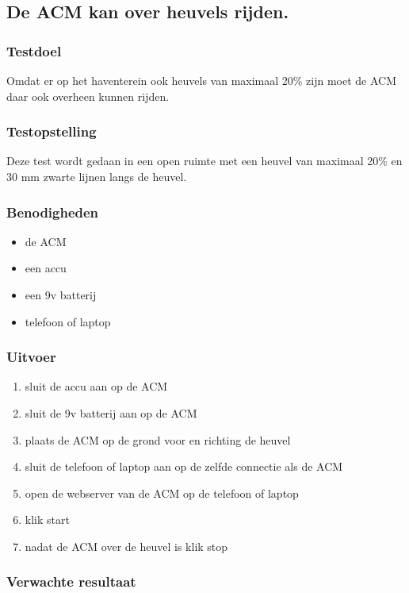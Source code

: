 \subsection{De ACM kan over heuvels rijden.}
\subsubsection{Testdoel}
\begin{flushleft}
    Omdat er op het haventerein ook heuvels van maximaal 20\% zijn moet de ACM daar ook overheen kunnen rijden.
\end{flushleft}
\subsubsection{Testopstelling}
\begin{flushleft}
    Deze test wordt gedaan in een open ruimte met een heuvel van maximaal 20\% en 30 mm zwarte lijnen langs de heuvel.
\end{flushleft}
\subsubsection{Benodigheden}

\begin{itemize}
    \item de ACM
    \item een accu
    \item een 9v batterij
    \item telefoon of laptop
\end{itemize}
\subsubsection{Uitvoer}
\begin{enumerate}
    \item sluit de accu aan op de ACM
    \item sluit de 9v batterij aan op de ACM
    \item plaats de ACM op de grond voor en richting de heuvel
    \item sluit de telefoon of laptop aan op de zelfde connectie als de ACM
    \item open de webserver van de ACM op de telefoon of laptop
    \item klik start
    \item nadat de ACM over de heuvel is klik stop
\end{enumerate}
\subsubsection{Verwachte resultaat}

